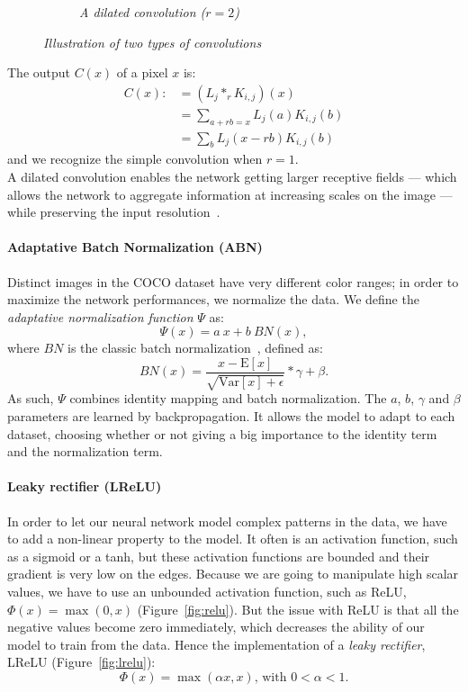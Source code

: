 \documentclass{article}
\begin{document}
\begin{figure}[!ht]
\begin{subfigure}{.49\linewidth}
                    \caption{\textit{A dilated convolution ($r=2$)}}
                    \label{fig:conv-dilated}
                \end{subfigure}
                \caption{\textit{Illustration of two types of convolutions}}
            \end{figure}

            \noindent The output $C(x)$ of a pixel $x$ is:
            \begin{align*}
            C(x):& = (L_j*_r K_{i,j})(x) \\
                 & = \sum_{a+rb=x}L_j(a)K_{i,j}(b) \\
                 & = \sum_b L_j(x-rb)K_{i,j}(b)
            \end{align*}
            and we recognize the simple convolution when $r=1$.\\
            A dilated convolution enables the network getting larger receptive fields --- which allows the network to aggregate information at increasing scales on the image --- while preserving the input resolution~\cite{dilated}.


            \paragraph{Adaptative Batch Normalization (ABN)} Distinct images in the COCO dataset have very different color ranges; in order to maximize the network performances, we normalize the data. We define the \textit{adaptative normalization function} $\Psi$ as:
            $$\Psi(x)=a\ x+b\ BN(x),$$
            where $BN$ is the classic batch normalization~\cite{abn}, defined as:
            $$BN(x) = \frac{x-\mathrm{E}[x]}{\sqrt{\mathrm{Var}[x]+\epsilon}}*\gamma+\beta.$$
            As such, $\Psi$ combines identity mapping and batch normalization. The $a$, $b$, $\gamma$ and $\beta$ parameters are learned by backpropagation. It allows the model to adapt to each dataset, choosing whether or not giving a big importance to the identity term and the normalization term.

            \paragraph{Leaky rectifier (LReLU)} In order to let our neural network model complex patterns in the data, we have to add a non-linear property to the model. It often is an activation function, such as a sigmoid or a tanh, but these activation functions are bounded and their gradient is very low on the edges. Because we are going to manipulate high scalar values, we have to use an unbounded activation function, such as ReLU, $\Phi(x)=\max(0,x)$ (Figure~\ref{fig:relu}). But the issue with ReLU is that all the negative values become zero immediately, which decreases the ability of our model to train from the data. Hence the implementation of a \textit{leaky rectifier}, LReLU (Figure~\ref{fig:lrelu}):
            $$\Phi(x)=\max(\alpha x,x)\mbox{, with } 0<\alpha<1.$$
\end{document}
